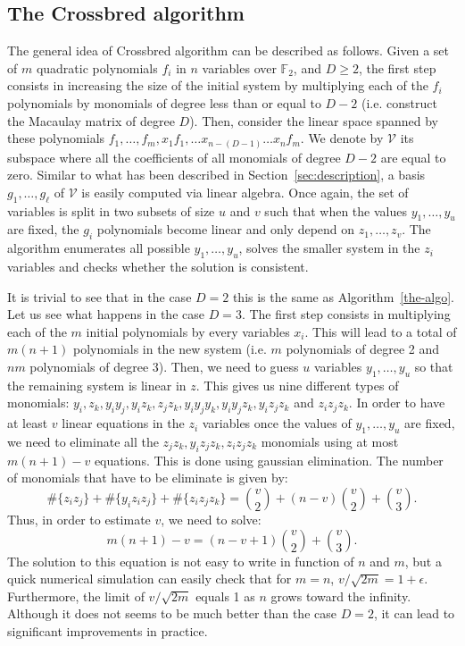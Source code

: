 \documentclass[a4paper,UKenglish,cleveref, autoref]{lipics-v2019}
\begin{document}
\subsection{The \textsf{Crossbred} algorithm}\label{sec:JV}

The general idea of \textsf{Crossbred} algorithm can be described as follows.
Given a set of $m$ quadratic polynomials $f_i$ in $n$ variables over $\mathbb{F}_2$, 
and $D \geq 2$, the first step consists in
increasing the size of the initial system by multiplying each of the $f_i$
polynomials by monomials of degree less than or equal to $D-2$ 
(i.e. construct the Macaulay matrix of degree $D$).
Then, consider the linear space spanned 
by these polynomials $f_1, \dots, f_m, x_1f_1, \dots x_{n-(D-1)}\dots x_{n}f_m$. 
We denote by $\mathcal{V}$ its subspace where all the coefficients of all 
monomials of degree $D -2$ are equal to zero. Similar to what has been 
described in Section~\ref{sec:description}, a basis $g_1, \dots, g_\ell$ of
$\mathcal{V}$ is easily computed via linear algebra. Once again, the set of variables
is split in two subsets of size $u$ and $v$ such that when the values $y_1, \dots, y_u$
are fixed, the $g_i$ polynomials become linear and only depend on $z_1, \dots, z_v$.
The algorithm enumerates all possible $y_1, \dots, y_u$, solves the smaller system in the $z_i$
variables and checks whether the solution is consistent.

It is trivial to see that in the case $D=2$ this is the same as Algorithm~\ref{the-algo}.
Let us see what happens in the case $D=3$. The first step consists in multiplying each of
the $m$ initial polynomials by every variables $x_i$. This will lead to a total of
$m(n+1)$ polynomials in the new system (i.e. $m$ polynomials of degree 2 and $nm$ polynomials
of degree 3). Then, we need to guess $u$ variables $y_1, \dots, y_u$ so that the remaining system
is linear in $z$. This gives us nine different types of monomials:
$y_i, z_k, y_iy_j, y_iz_k, z_jz_k, y_iy_jy_k, y_iy_jz_k, y_iz_jz_k$ and $z_iz_jz_k$.
In order to have at least $v$ linear equations in the $z_i$ variables once the values of $y_1, \dots, y_u$
are fixed, we need to eliminate all the $z_jz_k, y_iz_jz_k, z_iz_jz_k$ monomials using at 
most $m(n+1) - v$ equations. This is done using gaussian elimination. The number of monomials that 
have to be eliminate is given by:
\[
\#\{z_iz_j\} + \#\{y_iz_iz_j\} +\#\{z_iz_jz_k\}
= \binom{v}{2} + (n-v)\binom{v}{2} +\binom{v}{3}.
\]
Thus, in order to estimate $v$, we need to solve:
\[
m(n+1) -v = (n-v +1)\binom{v}{2} + \binom{v}{3}.
\]
The solution to this equation is not easy to write in function of $n$ and $m$, but a quick
numerical simulation can easily check that for $m=n$, $v/\sqrt{2m} = 1+\epsilon$. Furthermore,
the limit of $v/\sqrt{2m}$ equals 1 as $n$ grows toward the infinity. Although it does not seems
to be much better than the case $D=2$, it can lead to significant improvements in
practice.
\end{document}

